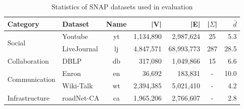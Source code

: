 \begin{table}[!t]
\centering
\caption{Statistics of SNAP datasets used in evaluation}
\label{tab:snap_datasets}
\begin{tabular}{|l|l|c|r|r|c|r|}
\hline
\textbf{Category} & \textbf{Dataset} & \textbf{Name} & \textbf{|V|} & \textbf{|E|} & \textbf{|$\Sigma$|} & \textbf{$\bar{d}$} \\
\hline
\multirow{2}{*}{Social} & Youtube & yt & 1,134,890 & 2,987,624 & 25 & 5.3 \\
\hline
 & LiveJournal & lj & 4,847,571 & 68,993,773 & 287 & 28.5 \\
\hline
Collaboration & DBLP & db & 317,080 & 1,049,866 & 15 & 6.6 \\
\hline
\multirow{2}{*}{Communication} & Enron & en & 36,692 & 183,831 & - & 10.0 \\
\hline
 & Wiki-Talk & wt & 2,394,385 & 5,021,410 & - & 4.2 \\
\hline
Infrastructure & roadNet-CA & ca & 1,965,206 & 2,766,607 & - & 2.8 \\
\hline
\end{tabular}
\end{table}